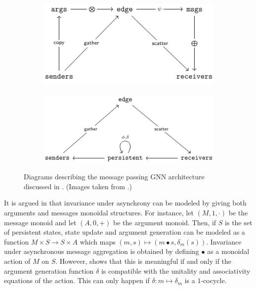 \documentclass[11pt,a4paper,openright,twoside]{report}
\theoremstyle{plain}
\theoremstyle{definition}
\begin{document}
\begin{figure}[h]
  \begin{center}
    \begin{subfigure}{0.4\textwidth}
      \includegraphics[width=\textwidth]{figures/message_passing_network1.png}
      \caption{}
    \end{subfigure}
    \hfill
    \begin{subfigure}{0.45\textwidth}
      \includegraphics[width=\textwidth]{figures/message_passing_network2.png}
      \caption{}
    \end{subfigure}            
    \caption[Persistent and transient features in message passing]{Diagrams describing the message passing GNN architecture discussed in \cite{dudzik2024asynchronous}. (Images taken from \cite{dudzik2024asynchronous}.)}
    \label{fig: messagepassing}
  \end{center}
\end{figure}

It is argued in \cite{dudzik2024asynchronous} that invariance under asynchrony can be modeled by giving both arguments and messages monoidal structures. For instance, let $(M, 1, \cdot)$ be the message monoid and let $(A, 0, +)$ be the argument monoid. Then, if $S$ is the set of persistent states, state update and argument generation can be modeled as a function $M \times S \to S \times A$ which maps $(m,s) \mapsto (m \bullet s, \delta_m(s))$. Invariance under asynchronous message aggregation is obtained by defining $\bullet$ as a monoidal action of $M$ on $S$. However, \cite{dudzik2024asynchronous} shows that this is meaningful if and only if the argument generation function $\delta$ is compatible with the unitality and associativity equations of the action. This can only happen if $\delta: m \mapsto \delta_m$ is a $1$-cocycle.
\end{document}
